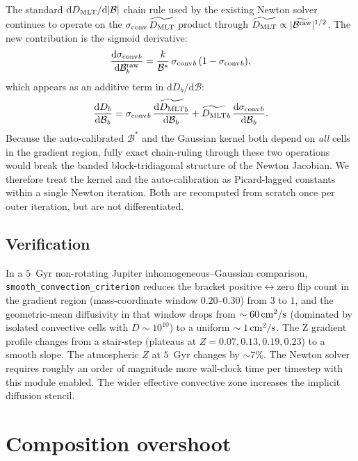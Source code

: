 \documentclass{aastex631}
\newcommand{\dd}{\mathrm{d}}
\newcommand{\Dmlt}{D_{\rm MLT}}
\newcommand{\sigmaconv}{\sigma_{\rm conv}}
\newcommand{\bracketraw}{\mathcal{B}^{\rm raw}}
\newcommand{\bracketb}{\mathcal{B}}
\newcommand{\bracketstar}{\mathcal{B}^{*}}
\begin{document}
The standard $\dd \Dmlt/\dd|\bracketb|$ chain rule used by the existing
Newton solver continues to operate on the
$\sigmaconv\,\widetilde{\Dmlt}$ product through
$\widetilde{\Dmlt} \propto |\widetilde{\bracketraw}|^{1/2}$.  The new
contribution is the sigmoid derivative:
\begin{equation}
\frac{\dd \sigmaconv{}_b}{\dd \bracketraw_b}
    = \frac{k}{\bracketstar}\, \sigmaconv{}_b\,(1 - \sigmaconv{}_b),
\end{equation}
which appears as an additive term in
$\dd D_b/\dd \bracketb$:
\begin{equation}
\frac{\dd D_b}{\dd \bracketb{}_b}
    = \sigmaconv{}_b\,\frac{\dd \widetilde{\Dmlt}_b}{\dd \bracketb{}_b}
      + \widetilde{\Dmlt}_b\,\frac{\dd \sigmaconv{}_b}{\dd \bracketb{}_b}.
\end{equation}
Because the auto-calibrated $\bracketstar$ and the Gaussian kernel
both depend on \emph{all} cells in the gradient region, fully exact
chain-ruling through these two operations would break the banded
block-tridiagonal structure of the Newton Jacobian.  We therefore
treat the kernel and the auto-calibration as Picard-lagged constants
within a single Newton iteration.  Both are recomputed from scratch
once per outer iteration, but are not differentiated.

\subsection{Verification}

In a $5$~Gyr non-rotating Jupiter inhomogeneous--Gaussian comparison,
\texttt{smooth\_convection\_criterion} reduces the bracket
positive$\leftrightarrow$zero flip count in the gradient region
(mass-coordinate window $0.20$--$0.30$) from $3$ to $1$, and the
geometric-mean diffusivity in that window drops from
$\sim 60\,\rm cm^2/s$ (dominated by isolated convective cells with
$D \sim 10^{10}$) to a uniform $\sim 1\,\rm cm^2/s$.  The Z gradient
profile changes from a stair-step (plateaus at $Z = 0.07, 0.13, 0.19,
0.23$) to a smooth slope.  The atmospheric $Z$ at $5$~Gyr changes by
$\sim 7\%$.  The Newton solver requires roughly an order of
magnitude more wall-clock time per timestep with this module enabled.
The wider effective convective zone increases the implicit
diffusion stencil.

\section{Composition overshoot}\label{sec:overshoot}
\end{document}
